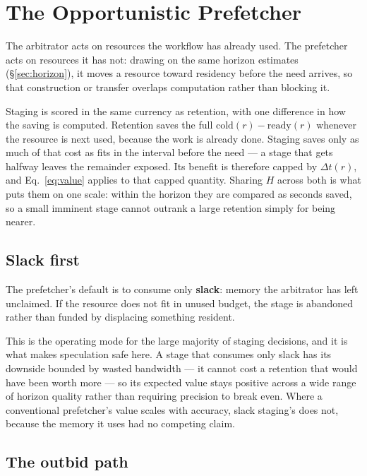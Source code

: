 \documentclass[10pt,twocolumn]{article}
\begin{document}
\section{The Opportunistic Prefetcher}
\label{sec:prefetch}

The arbitrator acts on resources the workflow has already used. The
prefetcher acts on resources it has not: drawing on the same horizon
estimates (\S\ref{sec:horizon}), it moves a resource toward residency before
the need arrives, so that construction or transfer overlaps computation
rather than blocking it.

Staging is scored in the same currency as retention, with one difference in
how the saving is computed. Retention saves the full
$\mathrm{cold}(r) - \mathrm{ready}(r)$ whenever the resource is next used,
because the work is already done. Staging saves only as much of that cost as
fits in the interval before the need --- a stage that gets halfway leaves the
remainder exposed. Its benefit is therefore capped by $\Delta t(r)$, and
Eq.~\ref{eq:value} applies to that capped quantity. Sharing $H$ across both
is what puts them on one scale: within the horizon they are compared as
seconds saved, so a small imminent stage cannot outrank a large retention
simply for being nearer.

\subsection{Slack first}

The prefetcher's default is to consume only \textbf{slack}: memory the
arbitrator has left unclaimed. If the resource does not fit in unused
budget, the stage is abandoned rather than funded by displacing something
resident.

This is the operating mode for the large majority of staging decisions, and
it is what makes speculation safe here. A stage that consumes only slack has
its downside bounded by wasted bandwidth --- it cannot cost a retention that
would have been worth more --- so its expected value stays positive across a
wide range of horizon quality rather than requiring precision to break even.
Where a conventional prefetcher's value scales with accuracy, slack staging's
does not, because the memory it uses had no competing claim.

\subsection{The outbid path}
\end{document}
